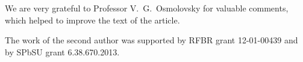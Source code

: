 \vskip 40pt

We are very grateful to Professor V.~G.~Osmolovsky for valuable comments,
which helped to improve the text of the article.

The work of the second author was supported by RFBR grant 12-01-00439
and by SPbSU grant 6.38.670.2013.